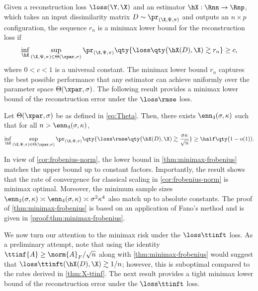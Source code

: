 \documentclass[10pt]{article}
\begin{document}
Given a reconstruction loss $\loss(\Y, \X)$ and an estimator $\hX: \Rnn \to \Rnp$, which takes an input dissimilarity matrix $D \sim \pr_{(\X, \Psi, \pi)}$ and outputs an $n\times p$ configuration, the sequence $r_n$ is a minimax lower bound for the reconstruction loss if
\begin{align}
    \inf_{\hX}\sup_{(\X, \Psi, \pi) \in \Theta(\xpar, \sigma)} \pr_{(\X, \Psi, \pi)}\qty{ \loss\qty\big(\hX(D), \X) \gtrsim r_n } \ge c,\label{eq:minimax-loss}
\end{align}
where $0 < c < 1$ is a universal constant. The minimax lower bound $r_n$ captures the best possible performance that any estimator can achieve uniformly over the parameter space $\Theta(\xpar, \sigma)$. The following result provides a minimax lower bound of the reconstruction error under the $\loss\rmse$ loss.

\begin{theorem}\label{thm:minimax-frobenius}
    Let $\Theta(\xpar, \sigma)$ be as defined in \cref{eq:Theta}. Then, there exists $\enn_4(\sigma, \kappa)$ such that for all $n > \enn_4(\sigma, \kappa)$,
    \begin{align}
        \inf_{\hX}\sup_{(\X, \Psi, \pi) \in \Theta(\xpar, \sigma)} \pr_{(\X, \Psi, \pi)}\qty{ \loss\rmse\qty\big(\hX(D), \X) \gtrsim \frac{\sigma\kappa}{\sqrt{n}} } \ge \half \qty\big( 1 - o(1) ).
    \end{align}
\end{theorem}

In view of \cref{cor:frobenius-norm}, the lower bound in \cref{thm:minimax-frobenius} matches the upper bound up to constant factors. Importantly, the result shows that the rate of convergence for classical scaling in \cref{cor:frobenius-norm} is minimax optimal. Moreover, the minimum sample sizes $\enn_2(\sigma, \kappa) \asymp \enn_4(\sigma, \kappa) \asymp \sigma^2\kappa^4$ also match up to absolute constants. The proof of \cref{thm:minimax-frobenius} is based on an application of Fano's method and is given in \cref{proof:thm:minimax-frobenius}.

We now turn our attention to the minimax risk under the $\loss\ttinft$ loss. As a preliminary attempt, note that using the identity $\ttinf{A} \ge \norm{A}_F/\sqrt{n} $ \citep[Proposition~6.3]{cape2019two} along with \cref{thm:minimax-frobenius} would suggest that $\loss\ttinft(\hX(D), \X) \gtrsim 1/n$; however, this is suboptimal compared to the rates derived in \cref{thm:X-ttinf}. The next result provides a tight minimax lower bound of the reconstruction error under the $\loss\ttinft$ loss.
\end{document}
